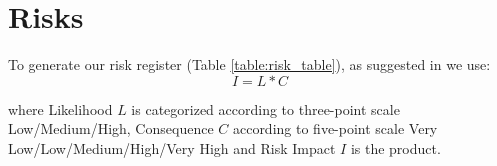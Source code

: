 \section{Risks} 
\label{risks}

To generate our risk register (Table \ref{table:risk_table}), as suggested in \cite{Dawson:2009:PCI:1611433} we use: 
\begin{equation}
I = L * C
\end{equation}

where Likelihood $L$ is categorized according to three-point scale 
Low/Medium/High, Consequence $C$ according to five-point
scale Very Low/Low/Medium/High/Very High and Risk Impact $I$ is the product.


